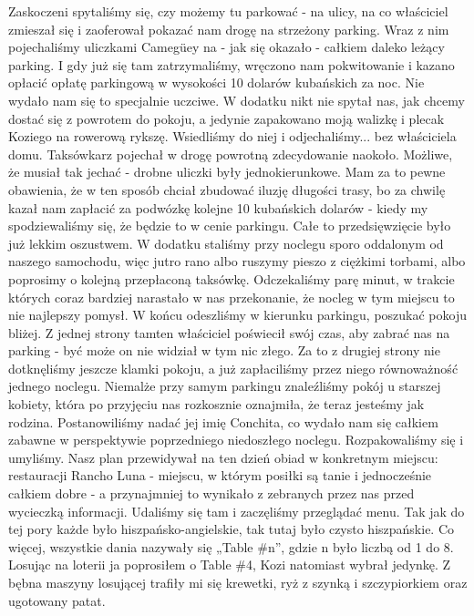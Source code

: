 \noindent Zaskoczeni spytaliśmy się, czy możemy tu parkować - na ulicy, na co właściciel zmieszał się i zaoferował pokazać nam drogę na strzeżony parking. 
Wraz z nim pojechaliśmy uliczkami Camegüey na - jak się okazało - całkiem daleko leżący parking.
I gdy już się tam zatrzymaliśmy, wręczono nam pokwitowanie i kazano opłacić opłatę parkingową w wysokości 10 dolarów kubańskich za noc. 
Nie wydało nam się to specjalnie uczciwe.
W dodatku nikt nie spytał nas, jak chcemy dostać się z powrotem do pokoju, a jedynie zapakowano moją walizkę i plecak Koziego na rowerową rykszę. 
Wsiedliśmy do niej i odjechaliśmy...
bez właściciela domu.
Taksówkarz pojechał w drogę powrotną zdecydowanie naokoło. Możliwe, że musiał tak jechać - drobne uliczki były jednokierunkowe. Mam za to pewne obawienia, że w ten sposób chciał zbudować iluzję długości trasy, bo za chwilę kazał nam zapłacić za podwózkę kolejne 10 kubańskich dolarów - kiedy my spodziewaliśmy się, że będzie to w cenie parkingu.
Całe to przedsięwzięcie było już lekkim oszustwem. 
W dodatku staliśmy przy noclegu sporo oddalonym od naszego samochodu, więc jutro rano albo ruszymy pieszo z ciężkimi torbami, albo poprosimy o kolejną przepłaconą taksówkę. 
Odczekaliśmy parę minut, w trakcie których coraz bardziej narastało w nas przekonanie, że nocleg w tym miejscu to nie najlepszy pomysł. W końcu odeszliśmy w kierunku parkingu, poszukać pokoju bliżej.
Z jednej strony tamten właściciel poświecił swój czas, aby zabrać nas na parking - być może on nie widział w tym nic złego.
Za to z drugiej strony nie dotknęliśmy jeszcze klamki pokoju, a już zapłaciliśmy przez niego równoważność jednego noclegu. 
Niemalże przy samym parkingu znaleźliśmy pokój u starszej kobiety, która po przyjęciu nas rozkosznie oznajmiła, że teraz jesteśmy jak rodzina. 
Postanowiliśmy nadać jej imię Conchita, co wydało nam się całkiem zabawne w perspektywie poprzedniego niedoszłego noclegu.
Rozpakowaliśmy się i umyliśmy. 
Nasz plan przewidywał na ten dzień obiad w konkretnym miejscu: restauracji Rancho Luna - miejscu, w którym posiłki są tanie i jednocześnie całkiem dobre - a przynajmniej to wynikało z zebranych przez nas przed wycieczką informacji. 
Udaliśmy się tam i zaczęliśmy przeglądać menu.
Tak jak do tej pory każde było hiszpańsko-angielskie, tak tutaj było czysto hiszpańskie. 
Co więcej, wszystkie dania nazywały się „Table \#n”, gdzie n było liczbą od 1 do 8.
Losując na loterii ja poprosiłem o Table \#4, Kozi natomiast wybrał jedynkę. 
Z bębna maszyny losującej trafiły mi się krewetki, ryż z szynką i szczypiorkiem oraz ugotowany patat. 
